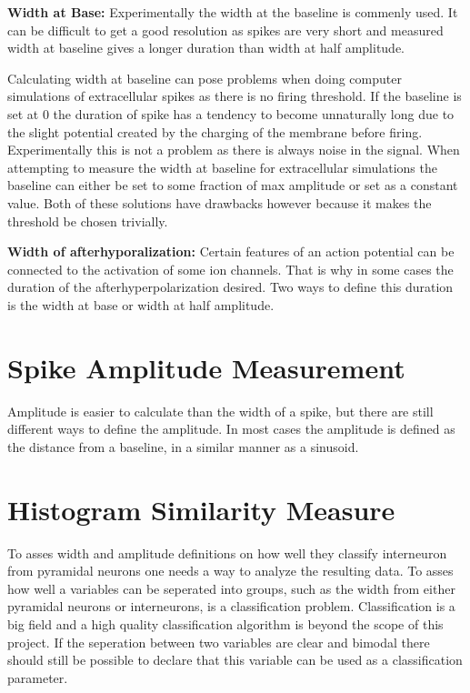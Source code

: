 \documentclass[altfont, fleqn]{uiophd}
\begin{document}
\noindent 
{\bf Width at Base:} 
Experimentally the width at the baseline is commenly used.
It can be difficult to get a good resolution as spikes are very short
and measured width at baseline gives a longer duration than width at half 
amplitude. 

Calculating width at baseline can pose problems when doing computer simulations
of extracellular spikes as there is no firing threshold. 
If the baseline is set at 0 the duration of spike has a tendency to become 
unnaturally long due to the slight potential created by the charging
of the membrane before firing. 
Experimentally this is not a problem as there is always noise
in the signal. 
When attempting to measure 
the width at baseline for extracellular simulations
the baseline can either be set to some fraction of max amplitude
or set as a constant value. 
Both of these solutions have drawbacks however because 
it makes the threshold be chosen trivially. 
\newline

\noindent 
{\bf Width of afterhyporalization:} 
Certain features of an action potential can be connected
to the 
activation of some ion channels. 
That is why in some cases the duration of the afterhyperpolarization 
desired. 
Two ways to define this duration is the width at base or width at half 
amplitude. 
\newline

\section{Spike Amplitude Measurement}
Amplitude is easier to calculate than the width of a spike, 
but there are still different ways to define the amplitude. 
In most cases the amplitude is defined as the distance from a baseline,
in a similar manner as a sinusoid.

\section{Histogram Similarity Measure}
\label{sec:similarity_measure}
To asses width and amplitude definitions on how well they 
classify interneuron from pyramidal neurons
one needs a way to analyze the resulting data. 
To asses how well a variables can be seperated into groups,
such as the width from either pyramidal neurons or 
interneurons,
is a classification problem. 
Classification is a big field and 
a high quality classification algorithm is beyond the scope of this project. 
If the seperation between two variables are clear and bimodal
there should still be possible to declare that this variable can
be used as a classification parameter. 
\end{document}
